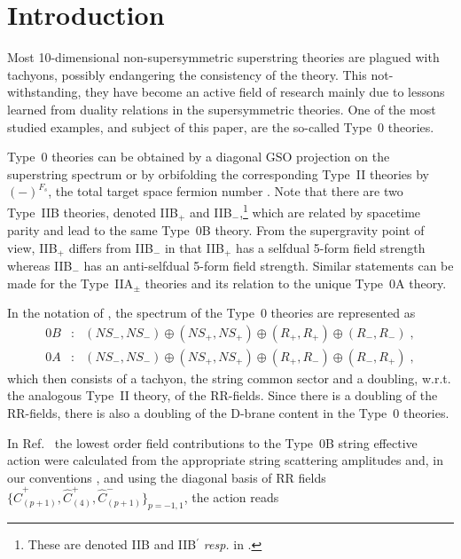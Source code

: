 \documentclass[12pt,a4paper]{article}
\begin{document}
\section*{Introduction}
Most 10-dimensional non-supersymmetric superstring theories are
plagued with tachyons, possibly endangering the consistency of the
theory.  This not-withstanding, they have become an active field of
research mainly due to lessons learned from duality relations in the
supersymmetric theories. One of the most studied examples, and subject
of this paper, are the so-called Type~0 theories.
\par
Type~0 theories can be obtained by a diagonal GSO projection on the
superstring spectrum or by orbifolding the corresponding Type~II
theories by $(-)^{F_{s}}$, the total target space fermion number
\cite{kn:DiHa}.  Note that there are two Type~IIB theories, denoted
IIB$_{+}$ and IIB$_{-}$,\footnote{These are denoted IIB and
  IIB$^{\prime}$ {\em resp.}  in \cite{joepboek}.} which are related
by spacetime parity and lead to the same Type~0B theory.  {}From the
supergravity point of view, IIB$_{+}$ differs from IIB$_{-}$ in that
IIB$_{+}$ has a selfdual 5-form field strength whereas IIB$_{-}$ has an
anti-selfdual 5-form field strength.  Similar statements can be made
for the Type~IIA$_{\pm}$ theories and its relation to the unique
Type~0A theory.
\par
In the notation of \cite{joepboek}, the spectrum of the Type~0
theories are represented as
\begin{eqnarray}
0B &:& 
(NS_{-},NS_{-})\oplus (NS_{+},NS_{+})\oplus 
(R_{+},R_{+})\oplus (R_{-},R_{-}) \; , \nonumber \\
%
0A &:& 
(NS_{-},NS_{-})\oplus (NS_{+},NS_{+})\oplus 
(R_{+},R_{-})\oplus (R_{-},R_{+}) \; ,
\end{eqnarray}
which then consists of a tachyon, the string common sector and a
doubling, w.r.t. the analogous Type~II theory, of the RR-fields.
Since there is a doubling of the RR-fields, there is also a doubling
of the D-brane content in the Type~0 theories.

In Ref.~\cite{kn:KlTs} the lowest order field contributions to the
Type~0B string effective action were calculated from the appropriate
string scattering amplitudes and, in our conventions \cite{kn:MO}, and
using the diagonal basis of RR fields
$\{\hat{C}_{(p+1)}^{+},\hat{C}_{(4)}^{+},
\hat{C}_{(p+1)}^{-}\}_{p=-1,1}$, the action reads
\end{document}
